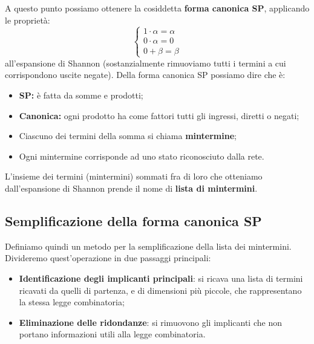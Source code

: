 \documentclass[a4paper,11pt]{article}
\begin{document}
A questo punto possiamo ottenere la cosiddetta \textbf{forma canonica SP}, applicando le proprietà:
\[
	\begin{cases}
		1 \cdot \alpha = \alpha \\ 
		0 \cdot \alpha = 0 \\ 
		0 + \beta = \beta
	\end{cases}
\]
all'espansione di Shannon (sostanzialmente rimuoviamo tutti i termini a cui corrispondono uscite negate).
Della forma canonica SP possiamo dire che è:
\begin{itemize}
	\item \textbf{SP:} è fatta da somme e prodotti;
	\item \textbf{Canonica:} ogni prodotto ha come fattori tutti gli ingressi, diretti o negati;
	\item Ciascuno dei termini della somma si chiama \textbf{mintermine};
	\item Ogni mintermine corrisponde ad uno stato riconosciuto dalla rete.
\end{itemize}

L'insieme dei termini (mintermini) sommati fra di loro che otteniamo dall'espansione di Shannon prende il nome di \textbf{lista di mintermini}.

\subsection{Semplificazione della forma canonica SP}
Definiamo quindi un metodo per la semplificazione della lista dei mintermini.
Divideremo quest'operazione in due passaggi principali:

\begin{itemize}
	\item \textbf{Identificazione degli implicanti principali}: si ricava una lista di termini ricavati da quelli di partenza, e di dimensioni più piccole, che rappresentano la stessa legge combinatoria;
	\item \textbf{Eliminazione delle ridondanze}: si rimuovono gli implicanti che non portano informazioni utili alla legge combinatoria.
\end{itemize}
\end{document}
